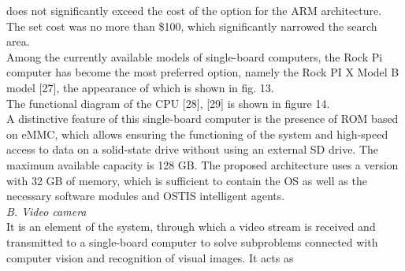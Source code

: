 \documentclass[10pt,twocolumn]{article}
\begin{document}
does not significantly exceed the cost of the option for
the ARM architecture. The set cost was no more than
\$100, which significantly narrowed the search area.\\

Among the currently available models of single-board
computers, the Rock Pi computer has become the most
preferred option, namely the Rock PI X Model B model
[27], the appearance of which is shown in fig. 13.\\

The functional diagram of the CPU [28], [29] is shown
in figure 14.\\

A distinctive feature of this single-board computer is
the presence of ROM based on eMMC, which allows
ensuring the functioning of the system and high-speed
access to data on a solid-state drive without using an
external SD drive. The maximum available capacity is
128 GB. The proposed architecture uses a version with
32 GB of memory, which is sufficient to contain the OS
as well as the necessary software modules and OSTIS
intelligent agents.\\

\textit{B. Video camera}\\

It is an element of the system, through which a video
stream is received and transmitted to a single-board
computer to solve subproblems connected with computer
vision and recognition of visual images. It acts as\\
\end{document}
